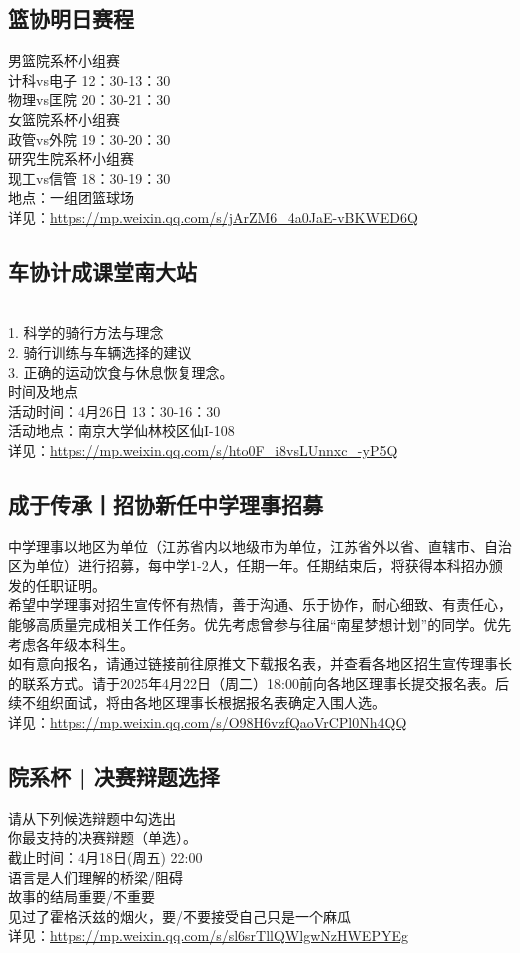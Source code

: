 \documentclass[letterpaper, 12pt]{article}
\begin{document}
\begin{multicols}{2}
\subsection{篮协明日赛程}
男篮院系杯小组赛
\\计科vs电子 12：30-13：30
\\物理vs匡院 20：30-21：30
\\女篮院系杯小组赛
\\政管vs外院 19：30-20：30
\\研究生院系杯小组赛
\\现工vs信管 18：30-19：30
\\地点：一组团篮球场
\\详见：\url{https://mp.weixin.qq.com/s/jArZM6_4a0JaE-vBKWED6Q}
\subsection{车协计成课堂南大站}
\\1.      科学的骑行方法与理念
\\2.      骑行训练与车辆选择的建议
\\3.      正确的运动饮食与休息恢复理念。
\\时间及地点
\\活动时间：4月26日 13：30-16：30
\\活动地点：南京大学仙林校区仙I-108
\\详见：\url{https://mp.weixin.qq.com/s/hto0F_i8vsLUnnxc_-yP5Q}
\subsection{成于传承丨招协新任中学理事招募}
中学理事以地区为单位（江苏省内以地级市为单位，江苏省外以省、直辖市、自治区为单位）进行招募，每中学1-2人，任期一年。任期结束后，将获得本科招办颁发的任职证明。
\\希望中学理事对招生宣传怀有热情，善于沟通、乐于协作，耐心细致、有责任心，能够高质量完成相关工作任务。优先考虑曾参与往届“南星梦想计划”的同学。优先考虑各年级本科生。
\\如有意向报名，请通过链接前往原推文下载报名表，并查看各地区招生宣传理事长的联系方式。请于2025年4月22日（周二）18:00前向各地区理事长提交报名表。后续不组织面试，将由各地区理事长根据报名表确定入围人选。
\\详见：\url{https://mp.weixin.qq.com/s/O98H6vzfQaoVrCPl0Nh4QQ}

\subsection{院系杯 | 决赛辩题选择}
请从下列候选辩题中勾选出
\\你最支持的决赛辩题（单选）。
\\截止时间：4月18日(周五) 22:00
\\语言是人们理解的桥梁/阻碍
\\故事的结局重要/不重要
\\见过了霍格沃兹的烟火，要/不要接受自己只是一个麻瓜
\\详见：\url{https://mp.weixin.qq.com/s/sl6srTllQWlgwNzHWEPYEg}

\end{multicols}
\end{document}
